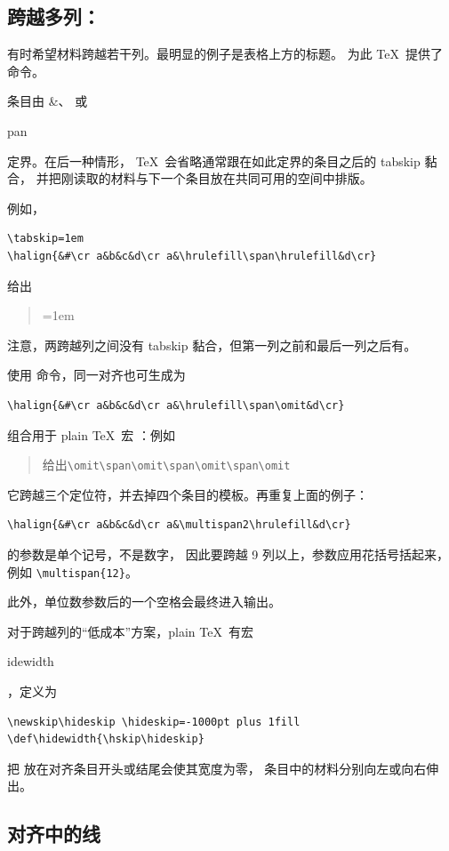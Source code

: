 \documentclass[a4paper]{rapport3}
\makeatletter
\def\alt{}\def\altt{}%
\newenvironment{disp}{\begin{quotation}}{\end{quotation}}
\def\cstoidx#1\par{\index{#1@\cs{#1}}}
\def\csidx#1{\cstoidx #1\par\cs{#1}}
\makeatother
\begin{document}
\subsection{跨越多列：}

有时希望材料跨越若干列。最明显的例子是表格上方的标题。
为此 \TeX\ 提供了  命令。

条目由 \n\&、 或 \csidx{span} 定界。在后一种情形，
\TeX\ 会省略通常跟在如此定界的条目之后的 tabskip 黏合，
并把刚读取的材料与下一个条目放在共同可用的空间中排版。

例如，
\begin{verbatim}
\tabskip=1em
\halign{&#\cr a&b&c&d\cr a&\hrulefill\span\hrulefill&d\cr}
\end{verbatim}
给出
\begin{disp}\leavevmode\vbox{\tabskip=1em
}
\end{disp}注意，两跨越列之间没有 tabskip 黏合，但第一列之前和最后一列之后有。
\alt

使用  命令，同一对齐也可生成为
\begin{verbatim}
\halign{&#\cr a&b&c&d\cr a&\hrulefill\span\omit&d\cr}
\end{verbatim}

 组合用于 plain \TeX\ 宏 ：例如
\begin{disp}\quad 给出\quad \verb>\omit\span\omit\span\omit\span\omit>
\end{disp}
它跨越三个定位符，并去掉四个条目的模板。再重复上面的例子：
\begin{verbatim}
\halign{&#\cr a&b&c&d\cr a&\multispan2\hrulefill&d\cr}
\end{verbatim}
 的参数是单个记号，不是数字，
因此要跨越 9 列以上，参数应用花括号括起来，例如 \verb>\multispan{12}>。
\alt
此外，单位数参数后的一个空格会最终进入输出。

对于跨越列的“低成本”方案，plain \TeX\ 有宏 \csidx{hidewidth}，定义为
\begin{verbatim}
\newskip\hideskip \hideskip=-1000pt plus 1fill 
\def\hidewidth{\hskip\hideskip}
\end{verbatim}
把  放在对齐条目开头或结尾会使其宽度为零，
条目中的材料分别向左或向右伸出。


\subsection{对齐中的线}
\end{document}
